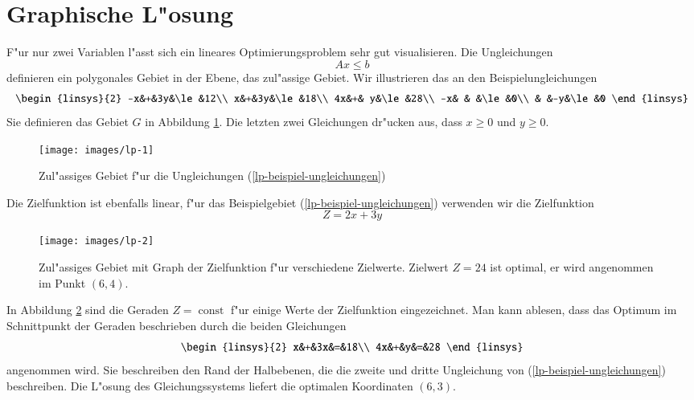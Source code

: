 \section{Graphische L"osung\label{lp:section:graphisch}}
F"ur nur zwei Variablen l"asst sich ein lineares Optimierungsproblem
sehr gut visualisieren. Die Ungleichungen
\[
Ax\le b
\]
definieren ein polygonales Gebiet in der Ebene, das zul"assige Gebiet.
Wir illustrieren das an den Beispielungleichungen
\begin{equation}
\begin{linsys}{2}
-x&+&3y&\le&12\\
 x&+&3y&\le&18\\
4x&+& y&\le&28\\
-x& &  &\le&0\\
  & &-y&\le&0
\end{linsys}
\label{lp-beispiel-ungleichungen}
\end{equation}
Sie definieren das Gebiet $G$ in Abbildung \ref{lp-beispiel}.
Die letzten zwei Gleichungen dr"ucken aus, dass $x\ge 0$ und $y\ge 0$.
\begin{figure}
\begin{center}
\texttt{[image: images/lp-1]}
\end{center}
\caption{Zul"assiges Gebiet f"ur die Ungleichungen
(\ref{lp-beispiel-ungleichungen})\label{lp-beispiel}}
\end{figure}

Die Zielfunktion ist ebenfalls linear, f"ur das Beispielgebiet
(\ref{lp-beispiel-ungleichungen}) verwenden wir die Zielfunktion
\begin{equation}
Z=2x+3y
\label{lp-beispiel-zielfunktion}
\end{equation}
\begin{figure}
\begin{center}
\texttt{[image: images/lp-2]}
\end{center}
\caption{Zul"assiges Gebiet mit Graph der Zielfunktion f"ur verschiedene
Zielwerte. Zielwert $Z=24$ ist optimal, er wird angenommen im
Punkt $(6,4)$.
\label{lp-beispiel-zielfunktion}}
\end{figure}%
In Abbildung \ref{lp-beispiel-zielfunktion} sind die Geraden $Z=\operatorname{const}$
f"ur einige Werte der Zielfunktion eingezeichnet.
Man kann ablesen, dass das Optimum im Schnittpunkt der Geraden
beschrieben durch die beiden Gleichungen
\begin{equation}
\begin{linsys}{2}
x&+&3x&=&18\\
4x&+&y&=&28
\end{linsys}
\notag
\end{equation}
angenommen wird. Sie beschreiben den Rand der Halbebenen, die die
zweite und dritte Ungleichung von (\ref{lp-beispiel-ungleichungen}) 
beschreiben.
Die L"osung des Gleichungssystems liefert die optimalen Koordinaten
$(6,3)$.

